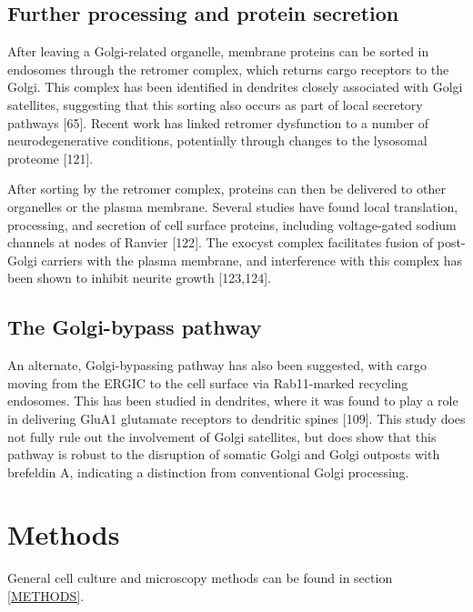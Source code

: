 \documentclass[
  12pt,
  a4paper,
]{book}
\begin{document}
\hypertarget{further-processing-and-protein-secretion}{%
\subsection{Further processing and protein secretion}\label{further-processing-and-protein-secretion}}

After leaving a Golgi-related organelle, membrane proteins can be sorted in endosomes through the retromer complex, which returns cargo receptors to the Golgi. This complex has been identified in dendrites closely associated with Golgi satellites, suggesting that this sorting also occurs as part of local secretory pathways {[}65{]}. Recent work has linked retromer dysfunction to a number of neurodegenerative conditions, potentially through changes to the lysosomal proteome {[}121{]}.

After sorting by the retromer complex, proteins can then be delivered to other organelles or the plasma membrane. Several studies have found local translation, processing, and secretion of cell surface proteins, including voltage-gated sodium channels at nodes of Ranvier {[}122{]}. The exocyst complex facilitates fusion of post-Golgi carriers with the plasma membrane, and interference with this complex has been shown to inhibit neurite growth {[}123,124{]}.

\hypertarget{the-golgi-bypass-pathway}{%
\subsection{The Golgi-bypass pathway}\label{the-golgi-bypass-pathway}}

An alternate, Golgi-bypassing pathway has also been suggested, with cargo moving from the ERGIC to the cell surface via Rab11-marked recycling endosomes. This has been studied in dendrites, where it was found to play a role in delivering GluA1 glutamate receptors to dendritic spines {[}109{]}. This study does not fully rule out the involvement of Golgi satellites, but does show that this pathway is robust to the disruption of somatic Golgi and Golgi outposts with brefeldin A, indicating a distinction from conventional Golgi processing.

\hypertarget{methods-2}{%
\section{Methods}\label{methods-2}}

General cell culture and microscopy methods can be found in section \ref{METHODS}.
\end{document}
